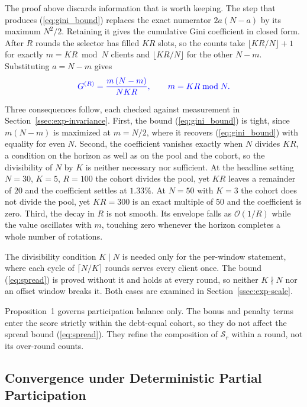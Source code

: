 \documentclass[journal]{IEEEtran}
\newcommand{\rev}[1]{{\color{blue}#1}}
\begin{document}
\rev{The proof above discards information that is worth keeping. The step that produces (\ref{eq:gini_bound}) replaces the exact numerator $2a(N-a)$ by its maximum $N^2/2$. Retaining it gives the cumulative Gini coefficient in closed form. After $R$ rounds the selector has filled $KR$ slots, so the counts take $\lfloor KR/N \rfloor + 1$ for exactly $m = KR \bmod N$ clients and $\lfloor KR/N \rfloor$ for the other $N-m$. Substituting $a = N-m$ gives}
\begin{equation}
\rev{G^{(R)} = \frac{m\,(N-m)}{N K R}, \qquad m = KR \bmod N .}
\label{eq:gini_exact}
\end{equation}

\rev{Three consequences follow, each checked against measurement in Section~\ref{ssec:exp-invariance}. First, the bound (\ref{eq:gini_bound}) is tight, since $m(N-m)$ is maximized at $m = N/2$, where it recovers (\ref{eq:gini_bound}) with equality for even $N$. Second, the coefficient vanishes exactly when $N$ divides $KR$, a condition on the horizon as well as on the pool and the cohort, so the divisibility of $N$ by $K$ is neither necessary nor sufficient. At the headline setting $N=30$, $K=5$, $R=100$ the cohort divides the pool, yet $KR$ leaves a remainder of $20$ and the coefficient settles at $1.33\%$. At $N=50$ with $K=3$ the cohort does not divide the pool, yet $KR = 300$ is an exact multiple of $50$ and the coefficient is zero. Third, the decay in $R$ is not smooth. Its envelope falls as $\mathcal{O}(1/R)$ while the value oscillates with $m$, touching zero whenever the horizon completes a whole number of rotations.}

\rev{The divisibility condition $K \mid N$ is needed only for the per-window statement, where each cycle of $\lceil N/K \rceil$ rounds serves every client once. The bound (\ref{eq:spread}) is proved without it and holds at every round, so neither $K \nmid N$ nor an offset window breaks it. Both cases are examined in Section~\ref{ssec:exp-scale}.}

Proposition~1 governs participation balance only. The bonus and penalty terms enter the score strictly within the debt-equal cohort, so they do not affect the spread bound (\ref{eq:spread}). They refine the composition of $\mathcal{S}_r$ within a round, not its over-round counts. %

\subsection{\rev{Convergence under Deterministic Partial Participation}}
\label{ssec:convergence-compat}
\end{document}
